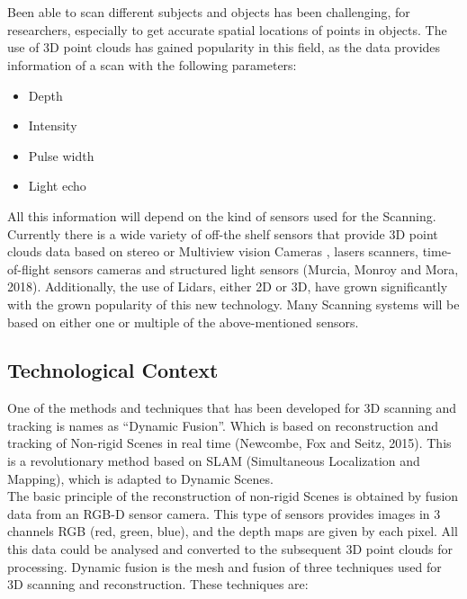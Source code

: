 \documentclass[a4paper]{article}
\begin{document}
\section*{}
Been able to scan different subjects and objects has been challenging, for researchers, especially to get accurate spatial locations of points in objects. The use of 3D point clouds has gained popularity in this field, as the data provides information of a scan with the following parameters: 
\begin{itemize}[]
    \itemsep0em 
    \item Depth
    \item Intensity
    \item Pulse width
    \item Light echo
\end{itemize}
All this information will depend on the kind of sensors used for the Scanning. Currently there is a wide variety of off-the shelf sensors that provide 3D point clouds data based on stereo or Multiview vision Cameras , lasers scanners, time-of-flight sensors cameras and structured light sensors (Murcia, Monroy and Mora, 2018). 
Additionally, the use of Lidars, either 2D or 3D, have grown significantly with the grown popularity of this new technology.
Many Scanning systems will be based on either one or multiple of the above-mentioned sensors. 

\subsection*{Technological Context}
One of the methods and techniques that has been developed for 3D scanning and tracking is names as “Dynamic Fusion”. Which is based on reconstruction and tracking of Non-rigid Scenes in real time (Newcombe, Fox and Seitz, 2015).
This is a revolutionary method based on SLAM (Simultaneous Localization and Mapping), which is adapted to Dynamic Scenes.\\[10pt]
The basic principle of the reconstruction of non-rigid Scenes is obtained by fusion data from an RGB-D sensor camera.
This type of sensors provides images in 3 channels RGB (red, green, blue), and the depth maps are given by each pixel. 
All this data could be analysed and converted to the subsequent 3D point clouds for processing.
Dynamic fusion is the mesh and fusion of three techniques used for 3D scanning and reconstruction.  These techniques are:
\end{document}
